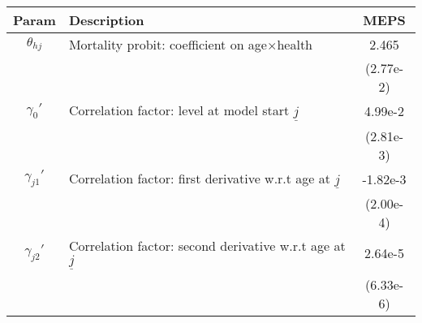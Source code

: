 \begin{table}[ht]\label{MEPSwomenCorrParams}
\footnotesize
\begin{center}
\begin{tabular}{clc}
\hline \hline
Param & Description & MEPS \\
\hline
$\theta_{hj}$ & Mortality probit: coefficient on age$\times$health & 2.465 \\
 & & (2.77e-2) \\
$\gamma_{0}'$ & Correlation factor: level at model start $\underline{j}$ & 4.99e-2 \\
 & & (2.81e-3) \\
$\gamma_{j1}'$ & Correlation factor: first derivative w.r.t age at $\underline{j}$ & -1.82e-3 \\
 & & (2.00e-4) \\
$\gamma_{j2}'$ & Correlation factor: second derivative w.r.t age at $\underline{j}$ & 2.64e-5 \\
 & & (6.33e-6) \\
\hline\hline
\end{tabular}
\end{center}
\end{table}
